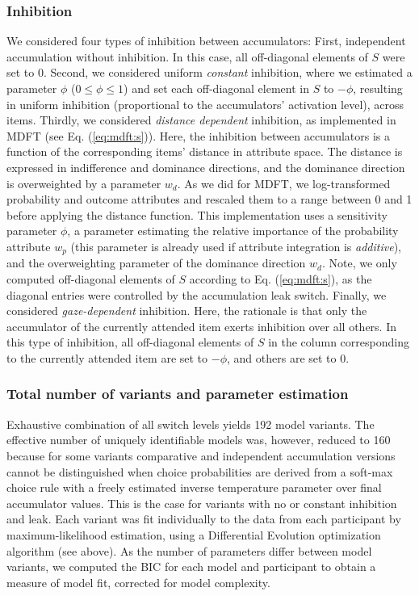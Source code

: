 \documentclass[11pt, a4paper]{article}
\begin{document}
\subsubsection*{Inhibition}
We considered four types of inhibition between accumulators: First, independent accumulation without inhibition. In this case, all off-diagonal elements of $S$ were set to 0.
Second, we considered uniform \emph{constant} inhibition, where we estimated a parameter $\phi$ ($0 \le \phi \le 1$) and set each off-diagonal element in $S$ to $-\phi$, resulting in uniform inhibition (proportional to the accumulators' activation level), across items.
Thirdly, we considered \emph{distance dependent} inhibition, as implemented in MDFT (see Eq. (\ref{eq:mdft:s})). Here, the inhibition between accumulators is a function of the corresponding items' distance in attribute space. The distance is expressed in indifference and dominance directions, and the dominance direction is overweighted by a parameter $w_d$. As we did for MDFT, we log-transformed probability and outcome attributes and rescaled them to a range between 0 and 1 before applying the distance function. 
This implementation uses a sensitivity parameter $\phi$, a parameter estimating the relative importance of the probability attribute $w_p$ (this parameter is already used if attribute integration is \emph{additive}), and the overweighting parameter of the dominance direction $w_d$. Note, we only computed off-diagonal elements of $S$ according to Eq. (\ref{eq:mdft:s}), as the diagonal entries were controlled by the accumulation leak switch.
Finally, we considered \emph{gaze-dependent} inhibition. Here, the rationale is that only the accumulator of the currently attended item exerts inhibition over all others. In this type of inhibition, all off-diagonal elements of $S$ in the column corresponding to the currently attended item are set to $-\phi$, and others are set to 0.

\subsubsection*{Total number of variants and parameter estimation}
Exhaustive combination of all switch levels yields 192 model variants. The effective number of uniquely identifiable models was, however, reduced to 160 because for some variants comparative and independent accumulation versions cannot be distinguished when choice probabilities are derived from a soft-max choice rule with a freely estimated inverse temperature parameter over final accumulator values. This is the case for variants with no or constant inhibition and leak. Each variant was fit individually to the data from each participant by maximum-likelihood estimation, using a Differential Evolution optimization algorithm (see above). As the number of parameters differ between model variants, we computed the BIC for each model and participant to obtain a measure of model fit, corrected for model complexity.
\end{document}
